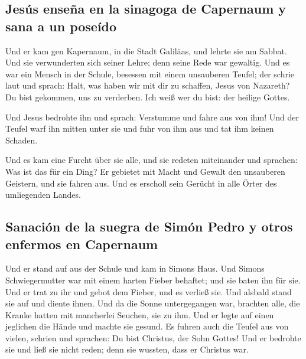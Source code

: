 \hypertarget{jesuxfas-enseuxf1a-en-la-sinagoga-de-capernaum-y-sana-a-un-poseuxeddo}{%
\subsection{Jesús enseña en la sinagoga de Capernaum y sana a un
poseído}\label{jesuxfas-enseuxf1a-en-la-sinagoga-de-capernaum-y-sana-a-un-poseuxeddo}}

 Und er kam gen Kapernaum, in die Stadt Galiläas, und
lehrte sie am Sabbat.  Und sie verwunderten sich seiner
Lehre; denn seine Rede war gewaltig.  Und es war ein
Mensch in der Schule, besessen mit einem unsauberen Teufel; der schrie
laut  und sprach: Halt, was haben wir mit dir zu
schaffen, Jesus von Nazareth? Du bist gekommen, uns zu verderben. Ich
weiß wer du bist: der heilige Gottes.

 Und Jesus bedrohte ihn und sprach: Verstumme und fahre
aus von ihm! Und der Teufel warf ihn mitten unter sie und fuhr von ihm
aus und tat ihm keinen Schaden.

 Und es kam eine Furcht über sie alle, und sie redeten
miteinander und sprachen: Was ist das für ein Ding? Er gebietet mit
Macht und Gewalt den unsauberen Geistern, und sie fahren aus.
 Und es erscholl sein Gerücht in alle Örter des
umliegenden Landes.

\hypertarget{sanaciuxf3n-de-la-suegra-de-simuxf3n-pedro-y-otros-enfermos-en-capernaum}{%
\subsection{Sanación de la suegra de Simón Pedro y otros enfermos en
Capernaum}\label{sanaciuxf3n-de-la-suegra-de-simuxf3n-pedro-y-otros-enfermos-en-capernaum}}

 Und er stand auf aus der Schule und kam in Simons Haus.
Und Simons Schwiegermutter war mit einem harten Fieber behaftet; und sie
baten ihn für sie.  Und er trat zu ihr und gebot dem
Fieber, und es verließ sie. Und alsbald stand sie auf und diente ihnen.
 Und da die Sonne untergegangen war, brachten alle, die
Kranke hatten mit mancherlei Seuchen, sie zu ihm. Und er legte auf einen
jeglichen die Hände und machte sie gesund.  Es fuhren
auch die Teufel aus von vielen, schrien und sprachen: Du bist Christus,
der Sohn Gottes! Und er bedrohte sie und ließ sie nicht reden; denn sie
wussten, dass er Christus war.

